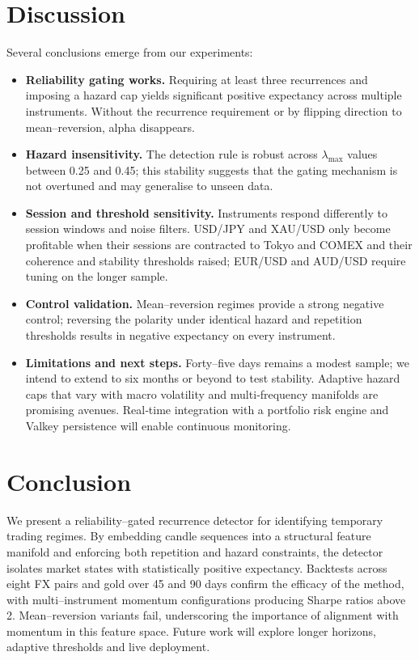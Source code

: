 \documentclass[11pt]{article}
\begin{document}
\section{Discussion}
Several conclusions emerge from our experiments:
\begin{itemize}
  \item \textbf{Reliability gating works.}  Requiring at least three
    recurrences and imposing a hazard cap yields significant positive
    expectancy across multiple instruments.  Without the recurrence
    requirement or by flipping direction to mean–reversion, alpha
    disappears\cite{reference_discussion}.
  \item \textbf{Hazard insensitivity.}  The detection rule is robust
    across $\lambda_{\max}$ values between 0.25 and 0.45; this
    stability suggests that the gating mechanism is not overtuned and
    may generalise to unseen data.
  \item \textbf{Session and threshold sensitivity.}  Instruments
    respond differently to session windows and noise filters.
    USD/JPY and XAU/USD only become profitable when their sessions are
    contracted to Tokyo and COMEX and their coherence and stability
    thresholds raised; EUR/USD and AUD/USD require tuning on the
    longer sample\cite{reference_discussion}.
  \item \textbf{Control validation.}  Mean–reversion regimes provide
    a strong negative control; reversing the polarity under
    identical hazard and repetition thresholds results in negative
    expectancy on every instrument.
  \item \textbf{Limitations and next steps.}  Forty–five days
    remains a modest sample; we intend to extend to six months or
    beyond to test stability.  Adaptive hazard caps that vary with
    macro volatility and multi‐frequency manifolds are promising
    avenues.  Real‐time integration with a portfolio risk engine and
    Valkey persistence will enable continuous monitoring\cite{reference_discussion}.
\end{itemize}

\section{Conclusion}
We present a reliability–gated recurrence detector for identifying
temporary trading regimes.  By embedding candle sequences into a
structural feature manifold and enforcing both repetition and hazard
constraints, the detector isolates market states with statistically
positive expectancy.  Backtests across eight FX pairs and gold over
45 and 90 days confirm the efficacy of the method, with
multi–instrument momentum configurations producing Sharpe ratios
above 2.  Mean–reversion variants fail, underscoring the
importance of alignment with momentum in this feature space.  Future
work will explore longer horizons, adaptive thresholds and live
deployment.
\end{document}
